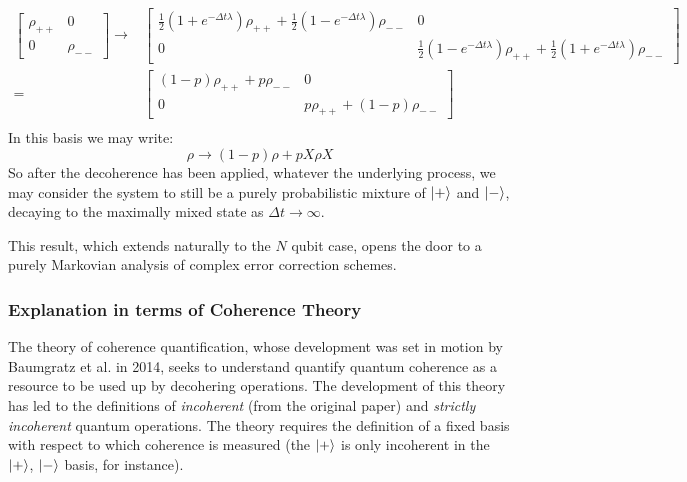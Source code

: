 \documentclass{report}
\begin{document}
\begin{appendices}
\begin{align*}
    \begin{bmatrix}
        \rho_{++} & 0\\ 0 & \rho_{--}
    \end{bmatrix}
    \longrightarrow
    &\begin{bmatrix}
        \frac{1}{2}(1+e^{-\Delta t \lambda})\rho_{++} + \frac{1}{2}(1-e^{-\Delta t \lambda})\rho_{--} & 0 \\
        0 & \frac{1}{2}(1-e^{-\Delta t \lambda})\rho_{++} + \frac{1}{2}(1+e^{-\Delta t \lambda})\rho_{--}
    \end{bmatrix}\\
    = &\begin{bmatrix}
        (1-p)\rho_{++} + p\rho_{--} & 0 \\
        0 & p\rho_{++} + (1-p)\rho_{--}
    \end{bmatrix}\\
\end{align*}
In this basis we may write:
\begin{equation*}
    \rho \longrightarrow (1-p)\rho + p X\rho X
\end{equation*}
So after the decoherence has been applied, whatever the underlying process, we may consider the system to still be a purely probabilistic mixture of $\ket{+}$ and $\ket{-}$, decaying to the maximally mixed state as $\Delta t \rightarrow \infty$.

This result, which extends naturally to the $N$ qubit case, opens the door to a purely Markovian analysis of complex error correction schemes.

\subsubsection{Explanation in terms of Coherence Theory}
The theory of coherence quantification, whose development was set in motion by Baumgratz et al. in 2014\cite{Baumgratz2014}, seeks to understand quantify quantum coherence as a resource to be used up by decohering operations. The development of this theory has led to the definitions of \textit{incoherent} (from the original paper) and \textit{strictly incoherent} \cite{Yadin2016} quantum operations. The theory requires the definition of a fixed basis with respect to which coherence is measured (the $\ket{+}$ is only incoherent in the $\ket{+}$, $\ket{-}$ basis, for instance). 


\end{appendices}
\end{document}
